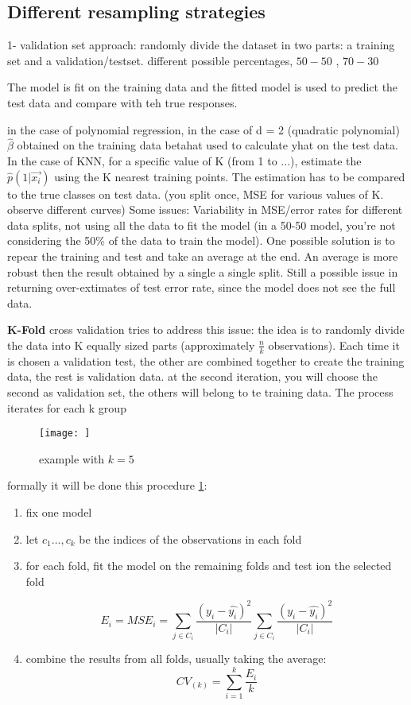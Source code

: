 \subsection{Different resampling strategies}
1- validation set approach:
randomly divide the dataset in two parts: a training set and a validation/testset. different possible  percentages, $ 50-50 $ , $ 70-30 $

The model is fit on the training data and the fitted model is used to predict the test data and compare with teh true responses. 

in the case of polynomial regression, in the case of d = 2 (quadratic polynomial)
$\hat{\beta}$ obtained on the training data
betahat used to calculate yhat on the test data.
In the case of KNN, for a specific value of K (from 1 to ...), estimate the $\hat{p}(1|\vec{x_i})$ using the K nearest training points. The estimation has to be compared to the true classes on test data. (you split once, MSE for various values of K. observe different curves)
Some issues:
Variability in MSE/error rates for different data splits, not using all the data to fit the model (in a 50-50 model, you're not considering the 50\% of the data to train the model).
One possible solution is to repear the training and test and take an average at the end. An average is more robust then the result obtained by a single a single split. Still a possible issue in returning over-extimates of test error rate, since the model does not see the full data.

\textbf{K-Fold} cross validation tries to address this issue:
the idea is to randomly divide the data into K equally sized parts (approximately $\frac{n}{k}$ observations). Each time it is chosen a validation test, the other are combined together to create the training data, the rest is validation data. at the second iteration, you will choose the second as validation set, the others will belong to te training data. The process iterates for each k group

\begin{figure}[h]
\caption{example with $k= 5$}
\centering
\texttt{[image: ]}
\label{procedKfoldCrossV}
\end{figure}

formally it will be done this procedure \ref{procedKfoldCrossV}:
\begin{enumerate}
	\item fix one model
	\item let $c_1 \dots, c_k$ be the indices of the observations in each fold
	\item for each fold, fit the model on the remaining folds and test ion the selected fold
	
	$$ E_i = MSE_i = \sum_{j \in C_i} \frac{(y_i - \hat{y_i})^2}{|C_i|}
	
	\sum_{j \in C_i} \frac{(y_i - \hat{y_i})^2}{|C_i|}$$
	
	\item combine the results from all folds, usually taking the average:
	$$CV_(k) = \sum_{i = 1}^k \frac{E_i}{k}$$
\end{enumerate}

